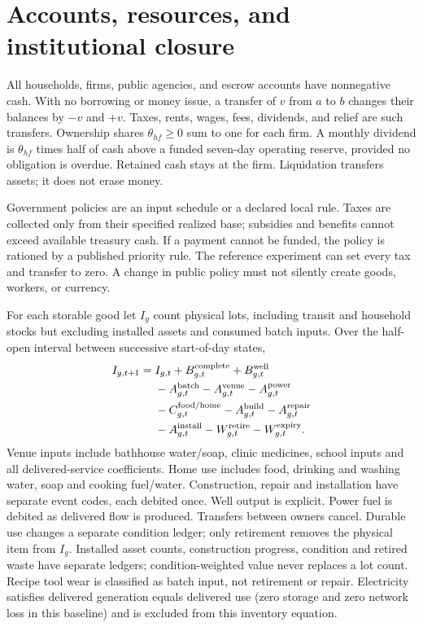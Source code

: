 \documentclass[10pt,a4paper,twocolumn]{article}
\begin{document}
\section{Accounts, resources, and institutional closure}
All households, firms, public agencies, and escrow accounts have
nonnegative cash. With no borrowing or money issue, a transfer of $v$
from $a$ to $b$ changes their balances by $-v$ and $+v$. Taxes, rents,
wages, fees, dividends, and relief are such transfers. Ownership shares
$\theta_{hf}\geq0$ sum to one for each firm. A monthly dividend is
$\theta_{hf}$ times half of cash above a funded seven-day operating
reserve, provided no obligation is overdue. Retained cash stays at the
firm. Liquidation transfers assets; it does not erase money.

Government policies are an input schedule or a declared local rule.
Taxes are collected only from their specified realized base; subsidies
and benefits cannot exceed available treasury cash. If a payment cannot
be funded, the policy is rationed by a published priority rule. The
reference experiment can set every tax and transfer to zero. A change
in public policy must not silently create goods, workers, or currency.

For each storable good let $I_g$ count physical lots, including transit
and household stocks but excluding installed assets and consumed batch
inputs. Over the half-open interval between successive start-of-day states,
\begin{align}
 I_{g,t+1}={}&I_{g,t}+B^{\rm complete}_{g,t}
 +B^{\rm well}_{g,t}\nonumber\\
 &-A^{\rm batch}_{g,t}-A^{\rm venue}_{g,t}
 -A^{\rm power}_{g,t}\nonumber\\
 &-C^{\rm food/home}_{g,t}-A^{\rm build}_{g,t}
 -A^{\rm repair}_{g,t}\nonumber\\
 &-A^{\rm install}_{g,t}-W^{\rm retire}_{g,t}
 -W^{\rm expiry}_{g,t}.
 \label{eq:material}
\end{align}
Venue inputs include bathhouse water/soap, clinic medicines, school inputs
and all delivered-service coefficients. Home use includes food, drinking
and washing water, soap and cooking fuel/water. Construction, repair and
installation have separate event codes, each debited once. Well output
is explicit. Power fuel is debited as delivered flow is produced.
Transfers between owners cancel. Durable use changes a separate condition
ledger; only retirement removes the physical item from $I_g$. Installed
asset counts, construction progress, condition and retired waste have
separate ledgers; condition-weighted value never replaces a lot count.
Recipe tool wear is classified as batch input, not retirement or repair.
Electricity satisfies delivered generation equals delivered use (zero
storage and zero network loss in this baseline) and is excluded from this
inventory equation.
\end{document}
